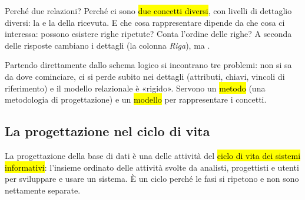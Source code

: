 Perché due relazioni? Perché ci sono \hl{due concetti diversi}, con livelli di dettaglio diversi: la  e la  della ricevuta. E che cosa rappresentare dipende da che cosa ci interessa: possono esistere righe ripetute? Conta l'ordine delle righe? A seconda delle risposte cambiano i dettagli (la colonna \emph{Riga}), ma .

Partendo direttamente dallo schema logico si incontrano tre problemi: non si sa da dove cominciare, ci si perde subito nei dettagli (attributi, chiavi, vincoli di riferimento) e il modello relazionale è «rigido». Servono un \hl{metodo} (una metodologia di progettazione) e un \hl{modello} per rappresentare i concetti.

\subsection{La progettazione nel ciclo di vita}

La progettazione della base di dati è una delle attività del \hl{ciclo di vita dei sistemi informativi}: l'insieme ordinato delle attività svolte da analisti, progettisti e utenti per sviluppare e usare un sistema. È un ciclo perché le fasi si ripetono e non sono nettamente separate.

\begin{center}
\end{center}

